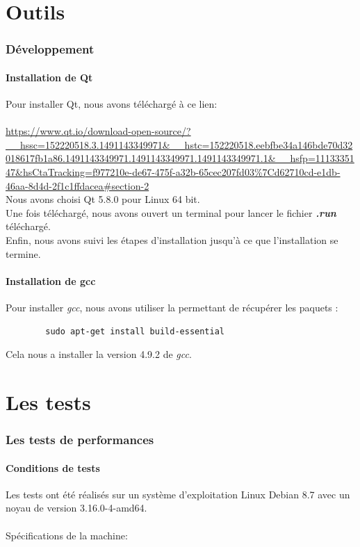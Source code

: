 \documentclass[12pt]{article}
\begin{document}
\newpage
\part{Outils}
	\section{Développement}
		\subsection{Installation de Qt}
		Pour installer Qt, nous avons téléchargé à ce lien:\\ \\
		\url{https://www.qt.io/download-open-source/?__hssc=152220518.3.1491143349971&__hstc=152220518.eebfbe34a146bde70d32018617fb1a86.1491143349971.1491143349971.1491143349971.1&__hsfp=1113335147&hsCtaTracking=f977210e-de67-475f-a32b-65cec207fd03%7Cd62710cd-e1db-46aa-8d4d-2f1c1ffdacea#section-2} \\
		
		Nous avons choisi Qt 5.8.0 pour Linux 64 bit.\\
		Une fois téléchargé, nous avons ouvert un terminal pour lancer le fichier \textit{\textbf{.run}} téléchargé.\\
		Enfin, nous avons suivi les étapes d'installation jusqu'à ce que l'installation se termine.
		
		\subsection{Installation de gcc}
		Pour installer \textit{gcc}, nous avons utiliser la permettant de récupérer les paquets :
		\begin{verbatim}
		sudo apt-get install build-essential
		\end{verbatim}
		Cela nous a installer la version 4.9.2 de \textit{gcc}.
		

\newpage
\part{Les tests}
	\section{Les tests de performances} \label{tests_performances}
		\subsection{Conditions de tests}
		Les tests ont été réalisés sur un système d’exploitation Linux Debian 8.7 avec
		un noyau de version 3.16.0-4-amd64. \\ \\
		Spécifications de la machine: \\
		
\end{document}
